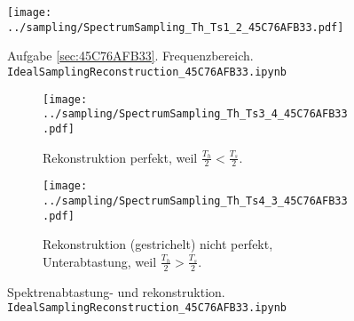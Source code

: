 \begin{figure}
\centering
\texttt{[image: ../sampling/SpectrumSampling\_Th\_Ts1\_2\_45C76AFB33.pdf]}
\caption{Aufgabe \ref{sec:45C76AFB33}. Frequenzbereich. \texttt{IdealSamplingReconstruction\_45C76AFB33.ipynb}}
\label{fig:SpectrumSampling_Th_Ts1_2_45C76AFB33}
\end{figure}



\begin{figure*}[h]
\centering
\begin{subfigure}{0.75\textwidth}
\texttt{[image: ../sampling/SpectrumSampling\_Th\_Ts3\_4\_45C76AFB33.pdf]}
\caption{Rekonstruktion perfekt, weil $\frac{T_h}{2}<\frac{T_s}{2}$.}
\label{fig:SpectrumSampling_Th_Ts3_4_45C76AFB33}
\end{subfigure}

\begin{subfigure}{0.75\textwidth}
\texttt{[image: ../sampling/SpectrumSampling\_Th\_Ts4\_3\_45C76AFB33.pdf]}
\caption{Rekonstruktion (gestrichelt) nicht perfekt, Unterabtastung, weil $\frac{T_h}{2}>\frac{T_s}{2}$.}
\label{fig:SpectrumSampling_Th_Ts4_3_45C76AFB33}
\end{subfigure}
\caption{Spektrenabtastung- und rekonstruktion. \texttt{IdealSamplingReconstruction\_45C76AFB33.ipynb}}
\label{fig:SpectrumSampling_Th_TsXX45C76AFB33}
\end{figure*}

